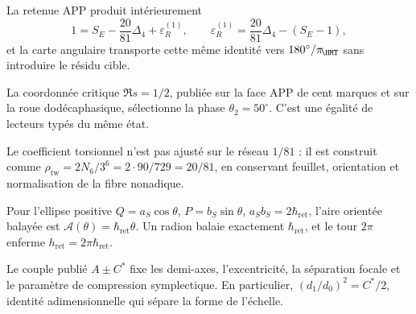 \begin{exactbox}[title={Clôture exacte et indépendance prospective}]
La retenue APP produit intérieurement
\[
1=S_E-\frac{20}{81}\Delta_4+\varepsilon_R^{(1)},
\qquad
\varepsilon_R^{(1)}=\frac{20}{81}\Delta_4-(S_E-1),
\]
et la carte angulaire transporte cette même identité vers
\(180^\circ/\pi_{\!\HMT}\) sans introduire le résidu cible.
\end{exactbox}

\begin{exactbox}[title={Coordonnée critique de \(50^\circ\)}]
La coordonnée critique \(\Re s=1/2\), publiée sur la face APP de cent
marques et sur la roue dodécaphasique, sélectionne la phase
\(\theta_2=50^\circ\). C'est une égalité de lecteurs typés du même état.
\end{exactbox}

\begin{exactbox}[title={Densité bidirectionnelle nonadique \(20/81\)}]
Le coefficient torsionnel n'est pas ajusté sur le réseau \(1/81\) : il est construit comme
\(\rho_{\mathrm{tw}}=2N_6/3^6=2\cdot90/729=20/81\), en conservant feuillet,
orientation et normalisation de la fibre nonadique.
\end{exactbox}

\begin{exactbox}[title={Loi surfacique du radion}]
Pour l'ellipse positive
\(Q=a_S\cos\theta\), \(P=b_S\sin\theta\),
\(a_Sb_S=2\hbar_{\mathrm{ret}}\), l'aire orientée balayée est
\(\mathcal A(\theta)=\hbar_{\mathrm{ret}}\theta\). Un radion balaie exactement
\(\hbar_{\mathrm{ret}}\), et le tour \(2\pi\) enferme
\(h_{\mathrm{ret}}=2\pi\hbar_{\mathrm{ret}}\).
\end{exactbox}

\begin{exactbox}[title={Invariants focaux de l'opérateur positif}]
Le couple publié \(A\pm C^\ast\) fixe les demi-axes, l'excentricité, la
séparation focale et le paramètre de compression symplectique. En particulier,
\((d_1/d_0)^2=C^\ast/2\), identité adimensionnelle qui sépare la forme de l'échelle.
\end{exactbox}

